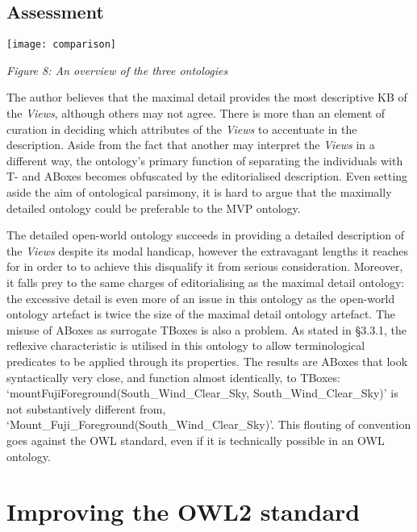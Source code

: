 \documentclass[titlepage,a4paper,12pt,oneside]{book}
\begin{document}
\section{Assessment}
\centerline{\texttt{[image: comparison]}}
\centerline{\textit{Figure 8: An overview of the three ontologies}}
\hfill \break
The author believes that the maximal detail provides the most descriptive KB of the \textit{Views}, although others may not agree.
There is more than an element of curation in deciding which attributes of the \textit{Views} to accentuate in the description.
Aside from the fact that another may interpret the \textit{Views} in a different way, the ontology's primary function of separating the individuals with T- and ABoxes becomes obfuscated by the editorialised description.
Even setting aside the aim of ontological parsimony, it is hard to argue that the maximally detailed ontology could be preferable to the MVP ontology.\par
The detailed open-world ontology succeeds in providing a detailed description of the \textit{Views} despite its modal handicap, however the extravagant lengths it reaches for in order to to achieve this disqualify it from serious consideration.
Moreover, it falls prey to the same charges of editorialising as the maximal detail ontology: the excessive detail is even more of an issue in this ontology as the open-world ontology artefact is twice the size of the maximal detail ontology artefact.
The misuse of ABoxes as surrogate TBoxes is also a problem.
As stated in §3.3.1, the reflexive characteristic is utilised in this ontology to allow terminological predicates to be applied through its properties.
The results are ABoxes that look syntactically very close, and function almost identically, to TBoxes: `mountFujiForeground(South\_Wind\_Clear\_Sky, South\_Wind\_Clear\_Sky)' is not substantively different from, `Mount\_Fuji\_Foreground(South\_Wind\_Clear\_Sky)'.
This flouting of convention goes against the OWL standard, even if it is technically possible in an OWL ontology.\par

\chapter{Improving the OWL2 standard}
\end{document}
